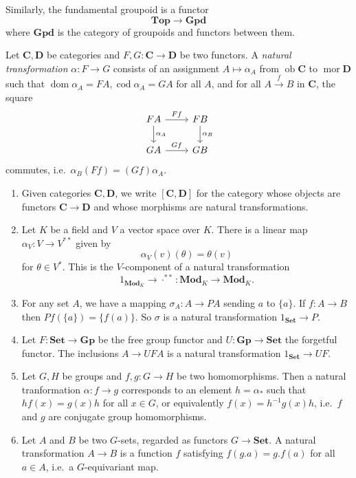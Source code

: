 \documentclass[a4paper]{article}
\renewcommand{\c}[1]{\mathbf{#1}}
\DeclareMathOperator{\ob}{ob}
\DeclareMathOperator{\mor}{mor}
\DeclareMathOperator{\dom}{dom}
\DeclareMathOperator{\cod}{cod}
\newcommand{\Set}{{\c{Set}}}
\newcommand{\Top}{{\c{Top}}}
\begin{document}
\begin{eg}
\begin{enumerate}
    Similarly, the fundamental groupoid is a functor
    \[
      \Top \to \c{Gpd}
    \]
    where \(\c{Gpd}\) is the category of groupoids and functors between them.
  \end{enumerate}
\end{eg}

\begin{definition}
  Let \(\c C, \c D\) be categories and \(F, G: \c C \to \c D\) be two functors. A \emph{natural transformation} \(\alpha: F \to G\) consists of an assignment \(A \mapsto \alpha_A\) from \(\ob \c C\) to \(\mor \c D\) such that \(\dom \alpha_A = FA, \cod \alpha_A = GA\) for all \(A\), and for all \(A \xrightarrow{f} B\) in \(\c C\), the square
  \[
    \begin{tikzcd}
      FA \ar[r, "Ff"] \ar[d, "\alpha_A"] & FB \ar[d, "\alpha_B"] \\
      GA \ar[r, "Gf"] & GB
    \end{tikzcd}
  \]
  commutes, i.e.\ \(\alpha_B(Ff) = (Gf)\alpha_A\).
\end{definition}

\begin{eg}\leavevmode
  \begin{enumerate}
  \item Given categories \(\c C, \c D\), we write \([\c C, \c D]\) for the category whose objects are functors \(\c C \to \c D\) and whose morphisms are natural transformations.
  \item Let \(K\) be a field and \(V\) a vector space over \(K\). There is a linear map \(\alpha_V: V \to V^{**}\) given by
    \[
      \alpha_V(v)(\theta) = \theta(v)
    \]
    for \(\theta \in V^*\). This is the \(V\)-component of a natural transformation
    \[
      1_{\c{Mod}_K} \to \cdot^{**}: \c{Mod}_K \to \c{Mod}_K.
    \]
  \item For any set \(A\), we have a mapping \(\sigma_A: A \to PA\) sending \(a\) to \(\{a\}\). If \(f: A \to B\) then \(Pf(\{a\}) = \{f(a)\}\). So \(\sigma\) is a natural transformation \(1_\Set \to P\).
  \item Let \(F: \Set \to \c{Gp}\) be the free group functor and \(U: \c{Gp} \to \Set\) the forgetful functor. The inclusions \(A \to UFA\) is a natural transformation \(1_\Set \to UF\).
  \item Let \(G, H\) be groups and \(f, g: G \to H\) be two homomorphisms. Then a natural tranformation \(\alpha: f \to g\) corresponds to an element \(h = \alpha_*\) such that \(h f(x) = g(x) h\) for all \(x \in G\), or equivalently \(f(x) = h^{-1} g(x) h\), i.e.\ \(f\) and \(g\) are conjugate group homomorphisms.
  \item Let \(A\) and \(B\) be two \(G\)-sets, regarded as functors \(G \to \Set\). A natural transformation \(A \to B\) is a function \(f\) satisfying \(f(g . a) = g. f(a)\) for all \(a \in A\), i.e.\ a \(G\)-equivariant map.
  \end{enumerate}
\end{eg}
\end{document}
